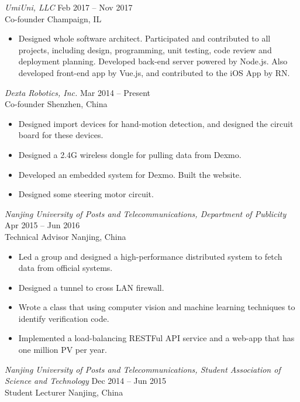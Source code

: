 \documentclass[margin=1in, 10pt]{res} %
\begin{document}
\begin{resume}
{\sl UmiUni, LLC} \hfill Feb 2017 -- Nov 2017 \\
Co-founder \hfill Champaign, IL
\vspace{0.05in}
\begin{itemize} \itemsep -2pt %
\item Designed whole software architect. Participated and contributed to all projects, including design, programming, unit testing, code review and deployment planning. Developed back-end server powered by Node.js. Also developed front-end app by Vue.js, and contributed to the iOS App by RN.
\end{itemize}

{\sl Dexta Robotics, Inc.} \hfill Mar 2014 -- Present \\
Co-founder \hfill Shenzhen, China
\vspace{0.05in}
\begin{itemize} \itemsep -2pt %
\item Designed import devices for hand-motion detection, and designed the circuit board for these devices.
\item Designed a 2.4G wireless dongle for pulling data from Dexmo.
\item Developed an embedded system for Dexmo. Built the website.
\item Designed some steering motor circuit.
\end{itemize}

{\sl Nanjing University of Posts and Telecommunications, Department of Publicity} \hfill Apr 2015 -- Jun 2016 \\
Technical Advisor \hfill Nanjing, China
\vspace{0.05in}
\begin{itemize} \itemsep -2pt %
\item Led a group and designed a high-performance distributed system to fetch data from official systems.
\item Designed a tunnel to cross LAN firewall.
\item Wrote a class that using computer vision and machine learning techniques to identify verification code.
\item Implemented a load-balancing RESTFul API service and a web-app that has one million PV per year.
\end{itemize}

{\sl Nanjing University of Posts and Telecommunications, Student Association of Science and Technology} \hfill Dec 2014 -- Jun 2015 \\
Student Lecturer \hfill Nanjing, China


\end{resume}
\end{document}
